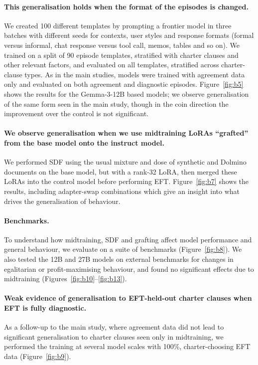\paragraph{This generalisation holds when the format of the episodes is changed.} We created 100 different templates by prompting a frontier model in three batches with different seeds for contexts, user styles and response formats (formal versus informal, chat response versus tool call, memos, tables and so on). We trained on a split of 90 episode templates, stratified with charter clauses and other relevant factors, and evaluated on all templates, stratified across charter-clause types. As in the main studies, models were trained with agreement data only and evaluated on both agreement and diagnostic episodes. Figure~\ref{fig:b5} shows the results for the Gemma-3-12B based models; we observe generalisation of the same form seen in the main study, though in the coin direction the improvement over the control is not significant.

\paragraph{We observe generalisation when we use midtraining LoRAs ``grafted'' from the base model onto the instruct model.} We performed SDF using the usual mixture and dose of synthetic and Dolmino documents on the base model, but with a rank-32 LoRA, then merged these LoRAs into the control model before performing EFT. Figure~\ref{fig:b7} shows the results, including adapter-swap combinations which give an insight into what drives the generalisation of behaviour.

\paragraph{Benchmarks.} To understand how midtraining, SDF and grafting affect model performance and general behaviour, we evaluate on a suite of benchmarks (Figure~\ref{fig:b8}). We also tested the 12B and 27B models on external benchmarks for changes in egalitarian or profit-maximising behaviour, and found no significant effects due to midtraining (Figures~\ref{fig:b10}--\ref{fig:b13}).

\paragraph{Weak evidence of generalisation to EFT-held-out charter clauses when EFT is fully diagnostic.} As a follow-up to the main study, where agreement data did not lead to significant generalisation to charter clauses seen only in midtraining, we performed the training at several model scales with 100\%, charter-choosing EFT data (Figure~\ref{fig:b9}).

